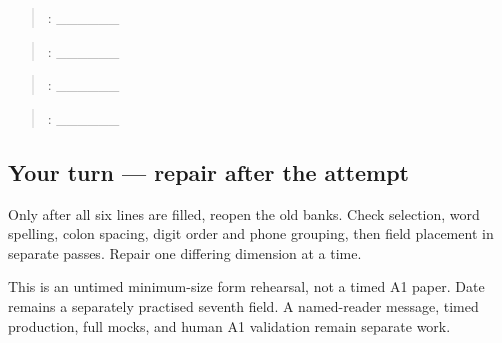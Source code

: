 \begin{quote}
: \_\_\_\_\_\_
\end{quote}

\begin{quote}
: \_\_\_\_\_\_
\end{quote}

\begin{quote}
: \_\_\_\_\_\_
\end{quote}

\begin{quote}
: \_\_\_\_\_\_
\end{quote}

\subsection*{Your turn — repair after the attempt}
Only after all six lines are filled, reopen the old banks. Check selection, word spelling, colon spacing, digit order and phone grouping, then field placement in separate passes. Repair one differing dimension at a time.

\begin{tcolorbox}[breakable,colback=teal!4,colframe=teal!35!black,title={Before you move on}]
This is an untimed minimum-size form rehearsal, not a timed A1 paper. Date remains a separately practised seventh field. A named-reader message, timed production, full mocks, and human A1 validation remain separate work.
\end{tcolorbox}
